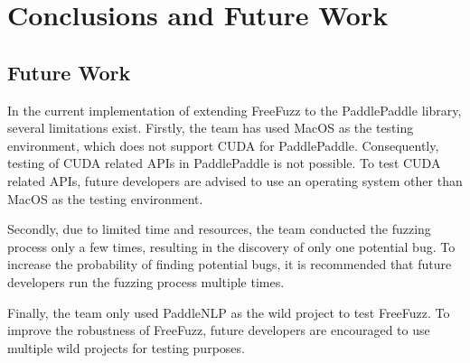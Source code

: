 \documentclass[sigconf]{acmart}
\begin{document}
\section{Conclusions and Future Work}
\subsection{Future Work}
In the current implementation of extending FreeFuzz to the PaddlePaddle library, several limitations exist. 
Firstly, the team has used MacOS as the testing environment, which does not support CUDA for PaddlePaddle\cite{c1}. 
Consequently, testing of CUDA related APIs in PaddlePaddle is not possible. 
To test CUDA related APIs, future developers are advised to use an operating system other than MacOS as the testing environment.

Secondly, due to limited time and resources, the team conducted the fuzzing process only a few times, 
resulting in the discovery of only one potential bug. 
To increase the probability of finding potential bugs, it is recommended that future developers run the fuzzing process multiple times.

Finally, the team only used PaddleNLP as the wild project to test FreeFuzz. 
To improve the robustness of FreeFuzz, future developers are encouraged to use multiple wild projects for testing purposes.
\end{document}
